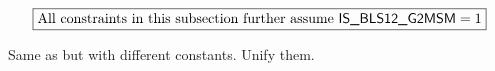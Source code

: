 \[
	\boxed{\text{All constraints in this subsection further assume } \textsf{IS\_BLS12\_G2MSM} = 1}
\]

Same as \oobInstBlsGOneMsm{} but with different constants. Unify them.